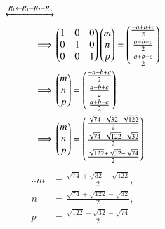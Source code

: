 \documentclass[journal,12pt,twocolumn]{IEEEtran}
\theoremstyle{remark}
\begin{document}
\begin{align}
    \xleftrightarrow[]{R_1 \leftarrow R_1-R_2-R_3}&\\
    \implies&\myvec{1&0&0\\0&1&0\\0&0&1}\myvec{m\\n\\p} = \myvec{\frac{-a+b+c}{2}\vspace{0.1cm}\\\frac{a-b+c}{2}\vspace{0.1cm}\\\frac{a+b-c}{2}}\\
    \implies&\myvec{m\\n\\p} = \myvec{\frac{-a+b+c}{2}\vspace{0.1cm}\\\frac{a-b+c}{2}\vspace{0.1cm}\\\frac{a+b-c}{2}}\\
    \implies&\myvec{m\\n\\p} = \myvec{\frac{\sqrt{74}+\sqrt{32}-\sqrt{122}}{2}\vspace{0.1cm}\\\frac{\sqrt{74}+\sqrt{122}-\sqrt{32}}{2}\vspace{0.1cm}\\\frac{\sqrt{122}+\sqrt{32}-\sqrt{74}}{2}}
\end{align}
\begin{align}
    \therefore
    m&= \frac{\sqrt{74}+\sqrt{32}-\sqrt{122}}{2},\\
    n&= \frac{\sqrt{74}+\sqrt{122}-\sqrt{32}}{2},\\
    p&= \frac{\sqrt{122}+\sqrt{32}-\sqrt{74}}{2}
\end{align}
\end{document}
